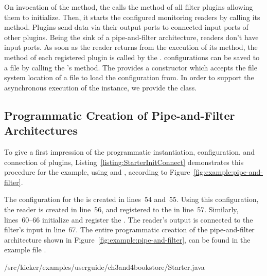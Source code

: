 \noindent On invocation of the  method, the  %
calls the  method of all filter plugins allowing them to initialize. %
Then, it starts the configured monitoring readers by calling its  %
method. Plugins send data via their output ports to connected input ports of other 
plugins. Being the sink of a pipe-and-filter architecture, readers don't have %
input ports. As soon as the reader returns from the execution of its  
method, the method  of each registered plugin is called by the %
. \KiekerAnalysisPart{} configurations can be saved %
to a  file by calling the 's  method. %
The  provides a constructor which accepts the %
file system location of a  file to load the configuration from. %
In order to support the asynchronous execution of the  instance, %
we provide the  class.

\subsection{Programmatic Creation of Pipe-and-Filter Architectures}\label{sec:analysis:programmaticCreation}

To give a first impression of the programmatic %
instantiation, configuration, and connection of plugins, Listing~\ref{listing:StarterInitConnect} %
demonstrates this procedure for the example, using  and %
, according to Figure~\ref{fig:example:pipe-and-filter}.

The configuration for the  is created in lines~54 and~55. %
Using this configuration, the reader is created in line~56, and registered to %
the  in line~57. Similarly, lines~60--66 initialize %
and register the . The reader's output is connected %
to the filter's input in line~67. %
The entire programmatic creation of the pipe-and-filter architecture shown %
in Figure~\ref{fig:example:pipe-and-filter}, can be found in the example  %
file .

\medskip

\setJavaCodeListing
%
{\customComponentsBookstoreApplicationDir/src/kieker/examples/userguide/ch3and4bookstore/Starter.java}


